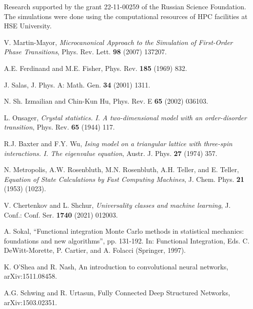 \documentclass[aps,prl,amssymb,amsmath,twocolumn,floatfix]{revtex4}
\begin{document}
\begin{acknowledgments}
Research supported by the grant 22-11-00259 of the Russian Science Foundation. 
The simulations were done using the computational resources of HPC facilities at HSE University. 
\end{acknowledgments}


\begin{thebibliography}{99}

 V. Martin-Mayor, {\em Microcanonical Approach to the Simulation of First-Order Phase Transitions}, Phys. Rev. Lett. {\bf 98} (2007) 137207.

 A.E. Ferdinand and M.E. Fisher, Phys. Rev. {\bf 185} (1969) 832.

 J. Salas, J. Phys. A: Math. Gen. {\bf 34} (2001) 1311.

 N. Sh. Izmailian and Chin-Kun Hu, Phys. Rev. E {\bf 65} (2002) 036103.




%

 L. Onsager,  {\em Crystal statistics. I. A two-dimensional model with an order-disorder transition}, Phys.
Rev. {\bf 65} (1944) 117.

 R.J. Baxter and F.Y. Wu, {\em Ising model on a triangular lattice with three-spin interactions. I. The eigenvalue equation}, Austr. J. Phys. {\bf 27} (1974) 357.

 N. Metropolis, A.W. Rosenbluth, M.N. Rosenbluth, A.H. Teller, and E. Teller, {\em Equation of State Calculations by Fast Computing Machines}, J. Chem. Phys. {\bf 21} (1953) (1023).

 V. Chertenkov and L. Shchur, {\em Universality classes and machine learning},  J. Conf.: Conf. Ser. {\bf 1740} (2021) 012003.
 
 A. Sokal, ``Functional integration Monte Carlo methods in statistical mechanics: foundations and new
algorithms'', pp. 131-192. In: Functional Integration, Eds. C. DeWitt-Morette, P. Cartier, and A. Folacci (Springer, 1997).

 K. O'Shea and R. Nash,  An introduction to convolutional neural networks, arXiv:1511.08458.

 A.G. Schwing and R. Urtasun, Fully Connected Deep Structured Networks, arXiv:1503.02351.


\end{thebibliography}
\end{document}
